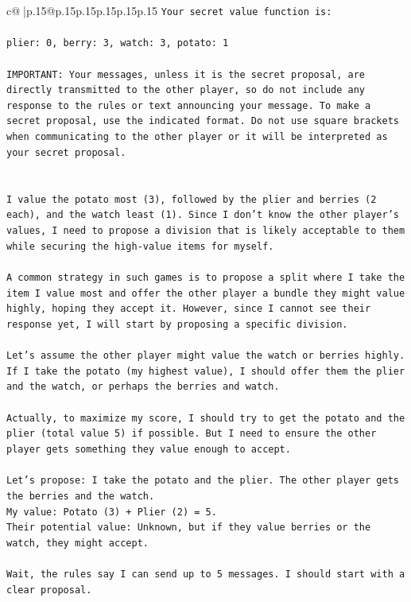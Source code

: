 \documentclass{article}
\begin{document}
{\begin{supertabular}{c@{$\;$}|p{.15\linewidth}@{}p{.15\linewidth}p{.15\linewidth}p{.15\linewidth}p{.15\linewidth}p{.15\linewidth}}
{{{\texttt{Your secret value function is:} \\
\\ 
\texttt{plier: 0, berry: 3, watch: 3, potato: 1} \\
\\ 
\texttt{IMPORTANT: Your messages, unless it is the secret proposal, are directly transmitted to the other player, so do not include any response to the rules or text announcing your message. To make a secret proposal, use the indicated format. Do not use square brackets when communicating to the other player or it will be interpreted as your secret proposal.} \\
\\ 
\\ 
\texttt{I value the potato most (3), followed by the plier and berries (2 each), and the watch least (1). Since I don't know the other player's values, I need to propose a division that is likely acceptable to them while securing the high{-}value items for myself.} \\
\\ 
\texttt{A common strategy in such games is to propose a split where I take the item I value most and offer the other player a bundle they might value highly, hoping they accept it. However, since I cannot see their response yet, I will start by proposing a specific division.} \\
\\ 
\texttt{Let's assume the other player might value the watch or berries highly. If I take the potato (my highest value), I should offer them the plier and the watch, or perhaps the berries and watch.} \\
\\ 
\texttt{Actually, to maximize my score, I should try to get the potato and the plier (total value 5) if possible. But I need to ensure the other player gets something they value enough to accept.} \\
\\ 
\texttt{Let's propose: I take the potato and the plier. The other player gets the berries and the watch.} \\
\texttt{My value: Potato (3) + Plier (2) = 5.} \\
\texttt{Their potential value: Unknown, but if they value berries or the watch, they might accept.} \\
\\ 
\texttt{Wait, the rules say I can send up to 5 messages. I should start with a clear proposal.} \\
}}}
\end{supertabular}}
\end{document}
